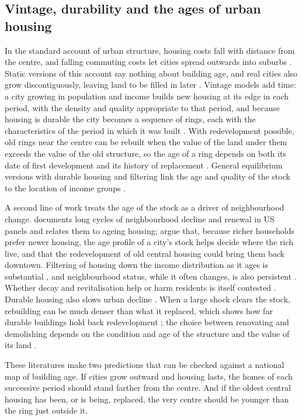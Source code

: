 \documentclass[11pt,a4paper]{article}
\begin{document}
\subsection{Vintage, durability and the ages of urban housing}
In the standard account of urban structure, housing costs fall with distance from the centre, and falling commuting costs let cities spread outwards into suburbs \citep{ioannides2008}. Static versions of this account say nothing about building age, and real cities also grow discontiguously, leaving land to be filled in later \citep{rodriguez1986}. Vintage models add time: a city growing in population and income builds new housing at its edge in each period, with the density and quality appropriate to that period, and because housing is durable the city becomes a sequence of rings, each with the characteristics of the period in which it was built \citep{harrison1974,brueckner1980}. With redevelopment possible, old rings near the centre can be rebuilt when the value of the land under them exceeds the value of the old structure, so the age of a ring depends on both its date of first development and its history of replacement \citep{wheaton1982,braid2001}. General equilibrium versions with durable housing and filtering link the age and quality of the stock to the location of income groups \citep{arnott1999}.

A second line of work treats the age of the stock as a driver of neighbourhood change. \citet{rosenthal2008} documents long cycles of neighbourhood decline and renewal in US panels and relates them to ageing housing; \citet{brueckner2009} argue that, because richer households prefer newer housing, the age profile of a city's stock helps decide where the rich live, and that the redevelopment of old central housing could bring them back downtown. Filtering of housing down the income distribution as it ages is substantial \citep{rosenthal2014}, and neighbourhood status, while it often changes, is also persistent \citep{rosenthal2015,malone2018}. Whether decay and revitalisation help or harm residents is itself contested \citep{vigdor2010}. Durable housing also slows urban decline \citep{glaeser2005}. When a large shock clears the stock, rebuilding can be much denser than what it replaced, which shows how far durable buildings hold back redevelopment \citep{siodla2015}; the choice between renovating and demolishing depends on the condition and age of the structure and the value of its land \citep{munneke2015,dube2018}.

These literatures make two predictions that can be checked against a national map of building age. If cities grow outward and housing lasts, the homes of each successive period should stand farther from the centre. And if the oldest central housing has been, or is being, replaced, the very centre should be younger than the ring just outside it.
\end{document}
